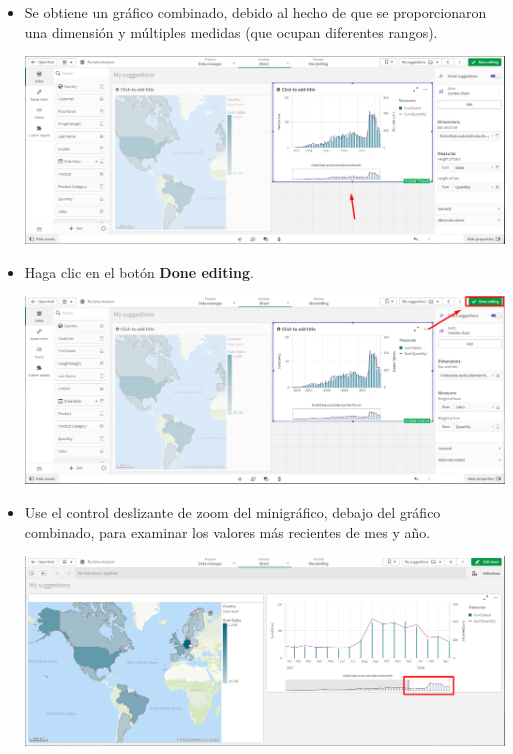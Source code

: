 \documentclass[12pt,letterpaper]{article}
\newcommand\tab[1][1cm]{\hspace*{#1}}
\begin{document}
\begin{enumerate}[\tab 1.]
\begin{center}
        \end{center}
        \begin{itemize}
            \item 
            Se obtiene un gráfico combinado, debido al hecho de que se proporcionaron una dimensión y múltiples medidas (que ocupan diferentes rangos).
            \begin{center}
                \includegraphics[width=13cm]{./img/img22.1.png}
            \end{center}
            \item Haga clic en el botón \textbf{Done editing}.
            \begin{center}
                \includegraphics[width=13cm]{./img/img22.2.png}
            \end{center}
            \item Use el control deslizante de zoom del minigráfico, debajo del gráfico combinado, para examinar los valores más recientes de mes y año.
            \begin{center}
                \includegraphics[width=13cm]{./img/img22.3.png}
            \end{center}
        \end{itemize}
    \end{enumerate}
\end{document}

